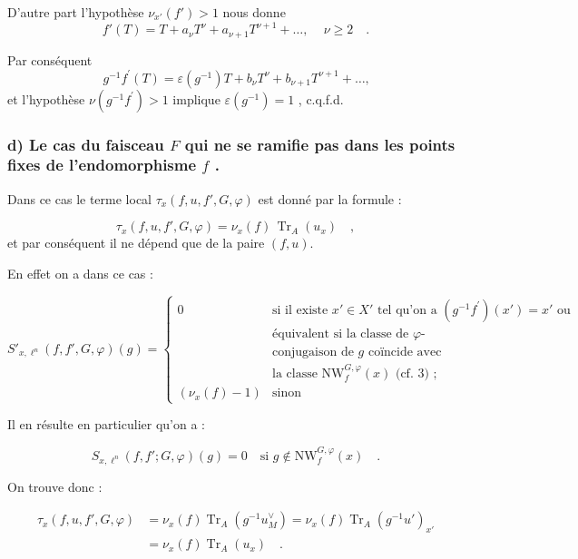 \documentclass[11pt]{article}
\providecommand{\Tr}{\operatorname{Tr}}
\providecommand{\Tr}{\operatorname{Tr}}
\providecommand{\Tr}{\operatorname{Tr}}
\providecommand{\Tr}{\operatorname{Tr}}
\providecommand{\Tr}{\operatorname{Tr}}
\begin{document}
D'autre part l'hypothèse $\nu_{x'}(f') > 1$ nous donne
\[
f'(T) = T + a_\nu T^\nu + a_{\nu+1} T^{\nu+1} + \ldots \text{, } \quad \nu \geq 2 \quad .
\]

Par conséquent
\[
g^{-1}f^{\prime}(T) = \varepsilon(g^{-1})T + b_\nu T^\nu + b_{\nu+1} T^{\nu+1} + \ldots \text{,}
\]
et l'hypothèse $\nu(g^{-1}f^{\prime}) > 1$ implique $\varepsilon(g^{-1}) = 1$ , c.q.f.d.

\subsubsection*{d) Le cas du faisceau $F$ qui ne se ramifie pas dans les points fixes de l'endomorphisme $f$ .}

Dans ce cas le terme local $\tau_x(f,u, f', G, \varphi)$ est donné par la formule :

\begin{equation}\tag{6.4.6}
\tau_x(f,u, f', G, \varphi) = \nu_x(f) \, \Tr_A(u_x) \quad ,
\end{equation}
et par conséquent il ne dépend que de la paire $(f,u)$.

En effet on a dans ce cas :

\begin{equation}\tag{6.4.7}
S'_{x,\ell^n}(f, f', G, \varphi)(g) = \begin{cases}
0 & \text{si il existe } x' \in X' \text{ tel qu'on a } (g^{-1}f^{\prime})(x') = x' \text{ ou}\\
& \text{équivalent si la classe de $\varphi$-}\\
& \text{conjugaison de $g$ coïncide avec}\\
& \text{la classe } \mathrm{NW}_{f}^{G,\varphi}(x) \text{ (cf. 3) ;}\\
(\nu_x(f)-1) & \text{sinon}
\end{cases}
\end{equation}

Il en résulte en particulier qu'on a :

\begin{equation}\tag{6.4.8}
S_{x,\ell^n}(f, f'; G, \varphi)(g) = 0 \quad \text{si } g \notin \mathrm{NW}_{f}^{G,\varphi}(x) \quad .
\end{equation}

On trouve donc :

\begin{equation}\tag{6.4.9}
\begin{aligned}
\tau_x(f,u, f', G, \varphi) &= \nu_x(f) \Tr_A(g^{-1}u_M^\vee) = \nu_x(f) \Tr_A(g^{-1}u')_{x'} \\
&= \nu_x(f) \Tr_A(u_x) \quad .
\end{aligned}
\end{equation}
\end{document}
